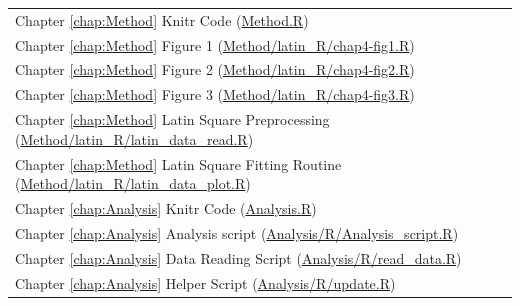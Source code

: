 \documentclass[reqno,12pt,oneside]{report}\usepackage[]{graphicx}\usepackage[]{color}
\theoremstyle{plain}
\theoremstyle{definition}
\theoremstyle{remark}
\numberwithin{theorem}{chapter}     %
\begin{document}
\begin{tabular}{l}
Chapter \ref{chap:Method} Knitr Code (\href{https://github.com/gjhunt/prelim/blob/master/Method.R}{Method.R})\\
Chapter \ref{chap:Method} Figure 1 (\href{https://github.com/gjhunt/prelim/blob/master/Method/latin_R/chap4-fig1.R}{Method/latin\_R/chap4-fig1.R})\\
Chapter \ref{chap:Method} Figure 2 (\href{https://github.com/gjhunt/prelim/blob/master/Method/latin_R/chap4-fig2.R}{Method/latin\_R/chap4-fig2.R})\\
Chapter \ref{chap:Method} Figure 3 (\href{https://github.com/gjhunt/prelim/blob/master/Method/latin_R/chap4-fig3.R}{Method/latin\_R/chap4-fig3.R})\\
Chapter \ref{chap:Method} Latin Square Preprocessing (\href{https://github.com/gjhunt/prelim/blob/master/Method/latin_R/latin_data_read.R}{Method/latin\_R/latin\_data\_read.R})\\
Chapter \ref{chap:Method} Latin Square Fitting Routine (\href{https://github.com/gjhunt/prelim/blob/master/Method/latin_R/latin_data_plot.R}{Method/latin\_R/latin\_data\_plot.R})\\
Chapter \ref{chap:Analysis} Knitr Code (\href{https://github.com/gjhunt/prelim/blob/master/Analysis.R}{Analysis.R})\\
Chapter \ref{chap:Analysis} Analysis script (\href{https://github.com/gjhunt/prelim/blob/master/Analysis/R/Analysis_script.R}{Analysis/R/Analysis\_script.R})\\
Chapter \ref{chap:Analysis} Data Reading Script (\href{https://github.com/gjhunt/prelim/blob/master/Analysis/R/read_data.R}{Analysis/R/read\_data.R})\\
Chapter \ref{chap:Analysis} Helper Script (\href{https://github.com/gjhunt/prelim/blob/master/Analysis/R/update.R}{Analysis/R/update.R})
\end{tabular}

%
\end{document}
